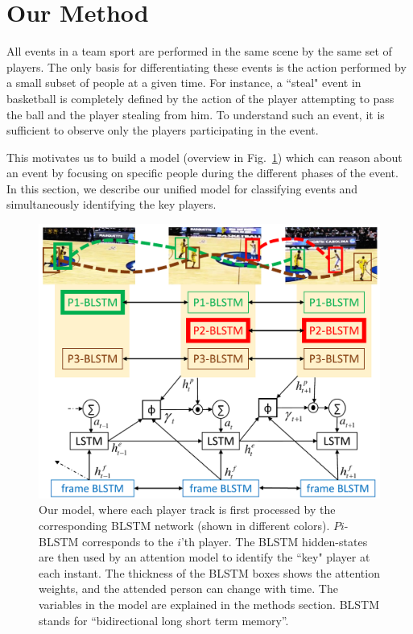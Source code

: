 \section{Our Method}
\label{sec:methods}

All events in a team sport are performed in the same scene by the same set of
players. The only basis for differentiating these events is the action
performed by a small subset of people at a given time.  For instance, a
``steal" event in basketball is completely defined by the action of the player
attempting to pass the ball and the player stealing from him.  To understand
such an event, it is sufficient to observe only the players participating in
the event.

This motivates us to build a model (overview in Fig.~\ref{fig:model})
which can reason about an event by focusing
on specific people during the different phases of the event.
In this section, we describe our unified model for classifying events
and simultaneously identifying the key players.

\begin{figure}[t!]
\begin{center}
    \includegraphics[width=3 in]{images/system_figure_1_cropped_v2.pdf}
\end{center}
   \caption{Our model, where each player track is first processed by the
     corresponding BLSTM network (shown in different colors).  $Pi$-BLSTM
     corresponds to the $i$'th player.  The BLSTM hidden-states are then used
     by an attention model to identify the ``key" player at each instant.  The
     thickness of the BLSTM boxes shows the attention weights, and the attended
     person can change with time.  The variables in the model are explained in
     the methods section.  BLSTM stands for ``bidirectional long short term
   memory''. }
\label{fig:model}
\end{figure}

